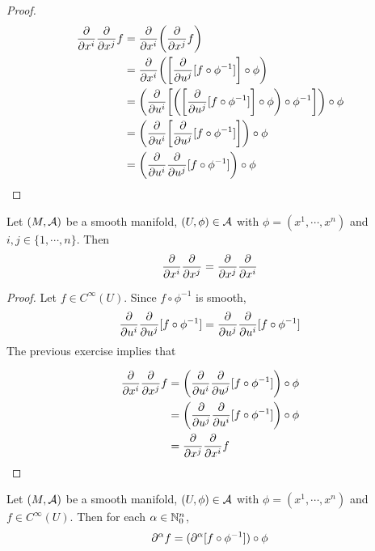 \documentclass{book}
\begin{document}
\begin{proof}
	
	\begin{align*}
		\frac{\partial}{\partial x^i}\frac{\partial}{\partial x^j} f 
		& =\frac{\partial}{\partial x^i} \bigg(\frac{\partial}{\partial x^j} f \bigg) \\
		& =\frac{\partial}{\partial x^i} \bigg( \bigg[\frac{\partial}{\partial u^j} [f \circ \phi^{-1}] \bigg] \circ \phi \bigg) \\
		& =  \bigg( \frac{\partial}{\partial u^i} \bigg[ \bigg( \bigg[\frac{\partial}{\partial u^j} [f \circ \phi^{-1}] \bigg] \circ \phi \bigg) \circ \phi^{-1} \bigg] \bigg) \circ \phi \\
		& = \bigg( \frac{\partial}{\partial u^i} \bigg[\frac{\partial}{\partial u^j} [f \circ \phi^{-1}] \bigg]  \bigg) \circ \phi \\
		& = \bigg( \frac{\partial}{\partial u^i} \frac{\partial}{\partial u^j} [f \circ \phi^{-1}]  \bigg) \circ \phi \\
	\end{align*}
\end{proof}

\begin{ex}  
	Let $(M, \mathcal{A})$ be a smooth manifold, $(U, \phi) \in \mathcal{A}$ with $\phi = (x^1, \cdots, x^n)$ and $i,j \in \{1, \cdots, n\}$. Then 
	\begin{equation*}
		\frac{\partial}{\partial x^i}\frac{\partial}{\partial x^j} =\frac{\partial}{\partial x^j}\frac{\partial}{\partial x^i}
	\end{equation*}
\end{ex}

\begin{proof}
	Let $f \in C^{\infty}(U)$. Since $f \circ \phi^{-1}$ is smooth, $$\frac{\partial}{\partial u^i} \frac{\partial}{\partial u^j} [f \circ \phi^{-1}] = \frac{\partial}{\partial u^j} \frac{\partial}{\partial u^i} [f \circ \phi^{-1}] $$
	The previous exercise implies that 
	
	\begin{align*}
		\frac{\partial}{\partial x^i}\frac{\partial}{\partial x^j}f 
		& = \bigg( \frac{\partial}{\partial u^i} \frac{\partial}{\partial u^j} [f \circ \phi^{-1}]  \bigg) \circ \phi \\
		& = \bigg( \frac{\partial}{\partial u^j} \frac{\partial}{\partial u^i} [f \circ \phi^{-1}]  \bigg) \circ \phi \\
		& =\frac{\partial}{\partial x^j}\frac{\partial}{\partial x^i}f 
	\end{align*}
\end{proof}

\begin{ex}  
	Let $(M, \mathcal{A})$ be a smooth manifold, $(U, \phi) \in \mathcal{A}$ with $\phi = (x^1, \cdots, x^n)$ and $f \in C^{\infty}(U)$. Then for each $\alpha \in \mathbb{N}_0^n$, $$\partial^{\alpha} f = (\partial^{\alpha}[ f \circ \phi^{-1}] ) \circ \phi$$
\end{ex}	
\end{document}
